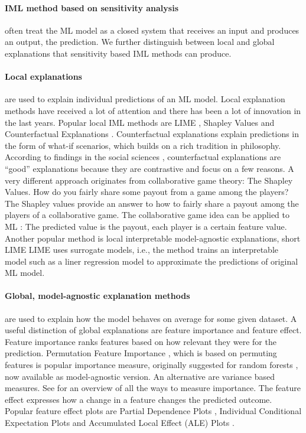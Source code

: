 \documentclass[runningheads]{llncs}
\begin{document}
\paragraph{IML method based on sensitivity analysis} often treat the ML model as a closed system that receives an input and produces an output, the prediction.
We further distinguish between local and global explanations that sensitivity based IML methods can produce.

\paragraph{Local explanations} are used to explain individual predictions of an ML model.
Local explanation methods have received a lot of attention and there has been a lot of innovation in the last years.
Popular local IML methods are LIME \cite{ribeiro2016should}, Shapley Values \cite{lundberg2017unified,vstrumbelj2014explaining} and Counterfactual Explanations \cite{wachter2017counterfactual,dandl2020multi}.
Counterfactual explanations explain predictions in the form of what-if scenarios, which builds on a rich tradition in philosophy.
According to findings in the social sciences \cite{miller2019explanation}, counterfactual explanations are \enquote{good} explanations because they are contrastive and focus on a few reasons.
A very different approach originates from collaborative game theory: The Shapley Values.
How do you fairly share some payout from a game among the players?
The Shapley values \cite{shapley1953value} provide an answer to how to fairly share a payout among the players of a collaborative game.
The collaborative game idea can be applied to ML \cite{vstrumbelj2014explaining,lundberg2017unified,lundberg2018consistent}: The predicted value is the payout, each player is a certain feature value.
Another popular method is local interpretable model-agnostic explanations, short LIME \cite{ribeiro2016should}
LIME uses surrogate models, i.e., the method trains an interpretable model such as a liner regression model to approximate the predictions of original ML model.

\paragraph{Global, model-agnostic explanation methods} are used to explain how the model behaves on average for some given dataset.
A useful distinction of global explanations are feature importance and feature effect.
Feature importance ranks features based on how relevant they were for the prediction.
Permutation Feature Importance \cite{fisher2019all}, which is based on permuting features is popular importance measure, originally suggested for random forests \cite{breiman2001random}, now available as model-agnostic version.
An alternative are variance based measures.
See \cite{wei2015variable} for an overview of all the ways to measure importance.
The feature effect expresses how a change in a feature changes the predicted outcome.
Popular feature effect plots are Partial Dependence Plots \cite{friedman2001greedy}, Individual Conditional Expectation Plots \cite{goldstein2015peeking} and Accumulated Local Effect  (ALE)  Plots \cite{apley2016visualizing}.
\end{document}
